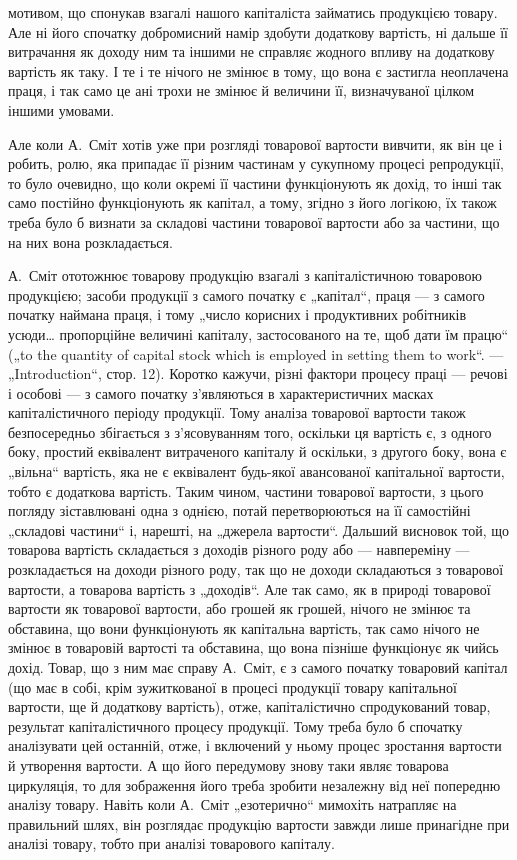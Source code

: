 \parcont{}  %
мотивом, що спонукав взагалі нашого капіталіста займатись продукцією
товару. Але ні його спочатку добромисний намір здобути додаткову
вартість, ні дальше її витрачання як доходу ним та іншими не справляє
жодного впливу на додаткову вартість як таку. І те і те нічого не змінює
в тому, що вона є застигла неоплачена праця, і так само це ані
трохи не змінює й величини її, визначуваної цілком іншими умовами.

Але коли А.~Сміт хотів уже при розгляді товарової вартости вивчити,
як він це і робить, ролю, яка припадає її різним частинам у сукупному
процесі репродукції, то було очевидно, що коли окремі її частини
функціонують як дохід, то інші так само постійно функціонують як капітал,
а тому, згідно з його логікою, їх також треба було б визнати за
складові частини товарової вартости або за частини, що на них вона
розкладається.

А.~Сміт ототожнює товарову продукцію взагалі з капіталістичною
товаровою продукцією; засоби продукції з самого початку є „капітал“,
праця — з самого початку наймана праця, і тому „число корисних і продуктивних
робітників усюди\dots{} пропорційне величині капіталу, застосованого
на те, щоб дати їм працю“ („to the quantity of capital stock which
is employed in setting them to work“. — „Introduction“, стор. 12). Коротко
кажучи, різні фактори процесу праці — речові і особові — з самого початку
з’являються в характеристичних масках капіталістичного періоду
продукції. Тому аналіза товарової вартости також безпосередньо збігається
з з’ясовуванням того, оскільки ця вартість є, з одного боку, простий
еквівалент витраченого капіталу й оскільки, з другого боку, вона є
„вільна“ вартість, яка не є еквівалент будь-якої авансованої капітальної
вартости, тобто є додаткова вартість. Таким чином, частини товарової
вартости, з цього погляду зіставлювані одна з однією, потай перетворюються
на її самостійні „складові частини“ і, нарешті, на „джерела вартости“.
Дальший висновок той, що товарова вартість складається з доходів
різного роду або — навпереміну — розкладається на доходи різного
роду, так що не доходи складаються з товарової вартости, а товарова
вартість з „доходів“. Але так само, як в природі товарової вартости як
товарової вартости, або грошей як грошей, нічого не змінює та обставина,
що вони функціонують як капітальна вартість, так само нічого не
змінює в товаровій вартості та обставина, що вона пізніше функціонує
як чийсь дохід. Товар, що з ним має справу А.~Сміт, є з самого початку
товаровий капітал (що має в собі, крім зужиткованої в процесі продукції
товару капітальної вартости, ще й додаткову вартість), отже, капіталістично
спродукований товар, результат капіталістичного процесу
продукції. Тому треба було б спочатку аналізувати цей останній, отже,
і включений у ньому процес зростання вартости й утворення вартости.
А що його передумову знову таки являє товарова циркуляція, то для
зображення його треба зробити незалежну від неї попередню аналізу
товару. Навіть коли А.~Сміт „езотерично“ мимохіть натрапляє на правильний
шлях, він розглядає продукцію вартости завжди лише принагідне
при аналізі товару, тобто при аналізі товарового капіталу.
\label{original-298}